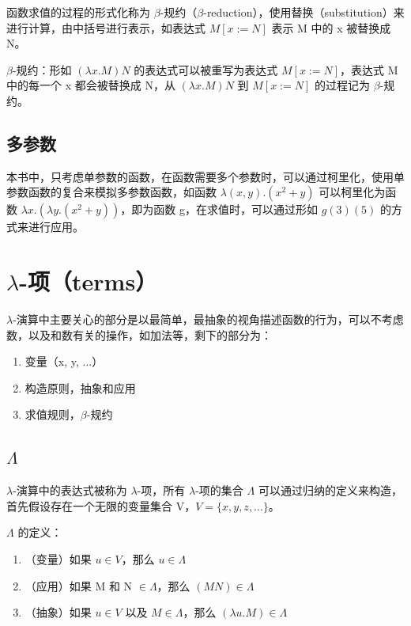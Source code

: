 \documentclass[UTF8]{article}
\begin{document}
	函数求值的过程的形式化称为 $\beta$-规约（$\beta$-reduction），使用替换（substitution）来进行计算，由中括号进行表示，如表达式 $M\left[x := N\right]$ 表示 M 中的 x 被替换成 N。
	
	$\beta$-规约：形如 $(\lambda x. M)N$ 的表达式可以被重写为表达式 $M\left[x := N\right]$，表达式 M 中的每一个 x 都会被替换成 N，从 $(\lambda x. M)N$ 到 $M\left[x := N\right]$ 的过程记为 $\beta$-规约。
	
\subsection{多参数}

	本书中，只考虑单参数的函数，在函数需要多个参数时，可以通过柯里化，使用单参数函数的复合来模拟多参数函数，如函数 $\lambda (x, y). (x^2 + y)$ 可以柯里化为函数 $\lambda x. (\lambda y. (x^2 + y))$，即为函数 g，在求值时，可以通过形如 $g(3)(5)$ 的方式来进行应用。

\section{$\lambda$-项（terms）}

	$\lambda$-演算中主要关心的部分是以最简单，最抽象的视角描述函数的行为，可以不考虑数，以及和数有关的操作，如加法等，剩下的部分为：
	
	\begin{enumerate}
		\item 变量（x, y, ...）
		\item 构造原则，抽象和应用
		\item 求值规则，$\beta$-规约
	\end{enumerate}
	
\subsection{$\Lambda$}

	$\lambda$-演算中的表达式被称为 $\lambda$-项，所有 $\lambda$-项的集合 $\Lambda$ 可以通过归纳的定义来构造，首先假设存在一个无限的变量集合 V，$V = \{x,y,z,...\}$。
	
	$\Lambda$ 的定义：
	\begin{enumerate}
		\item （变量）如果 $u \in V$，那么 $u \in \Lambda$
		\item （应用）如果 M 和 N $\in \Lambda$，那么 $(M N) \in \Lambda$
		\item （抽象）如果 $u \in V$ 以及 $M \in \Lambda$，那么 $(\lambda u. M) \in \Lambda$
	\end{enumerate}
	
\end{document}
